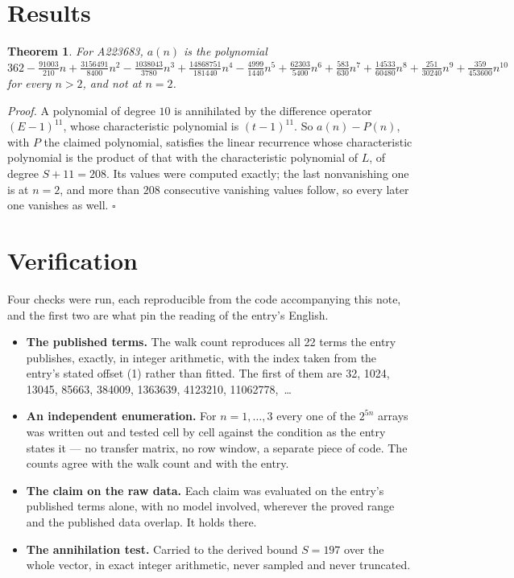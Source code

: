 \documentclass[11pt]{article}
\newtheorem{theorem}{Theorem}
\theoremstyle{definition}
\begin{document}
\section{Results}

\begin{theorem} For A223683, $a(n)$ is the polynomial $362 - \frac{91003}{210}n + \frac{3156491}{8400}n^{2} - \frac{1038043}{3780}n^{3} + \frac{14868751}{181440}n^{4} - \frac{4999}{1440}n^{5} + \frac{62303}{5400}n^{6} + \frac{583}{630}n^{7} + \frac{14533}{60480}n^{8} + \frac{251}{30240}n^{9} + \frac{359}{453600}n^{10}$ for every $n > 2$, and not at $n = 2$.\end{theorem}

{\itshape Proof.} A polynomial of degree $10$ is annihilated by the difference operator $(E-1)^{11}$, whose characteristic polynomial is $(t-1)^{11}$. So $a(n) - P(n)$, with $P$ the claimed polynomial, satisfies the linear recurrence whose characteristic polynomial is the product of that with the characteristic polynomial of $L$, of degree $S + 11 = 208$. Its values were computed exactly; the last nonvanishing one is at $n = 2$, and more than $208$ consecutive vanishing values follow, so every later one vanishes as well. $\square$

\section{Verification}

Four checks were run, each reproducible from the code accompanying this note, and the first two are what pin the reading of the entry's English.

\begin{itemize}

\item {\bfseries The published terms.} The walk count reproduces all 22 terms the entry publishes, exactly, in integer arithmetic, with the index taken from the entry's stated offset (1) rather than fitted. The first of them are 32, 1024, 13045, 85663, 384009, 1363639, 4123210, 11062778,~\dots

\item {\bfseries An independent enumeration.} For $n = 1,\dots,3$ every one of the $2^{5n}$ arrays was written out and tested cell by cell against the condition as the entry states it --- no transfer matrix, no row window, a separate piece of code. The counts agree with the walk count and with the entry.

\item {\bfseries The claim on the raw data.} Each claim was evaluated on the entry's published terms alone, with no model involved, wherever the proved range and the published data overlap. It holds there.

\item {\bfseries The annihilation test.} Carried to the derived bound $S = 197$ over the whole vector, in exact integer arithmetic, never sampled and never truncated.

\end{itemize}
\end{document}
